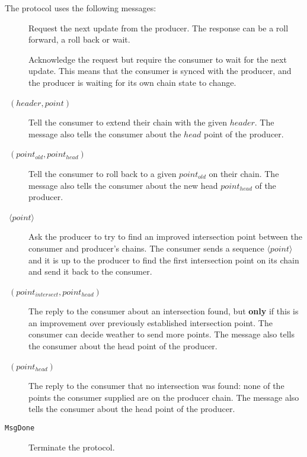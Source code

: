 \documentclass{report}
\newcommand{\msg}[1]{\texttt{#1}}
\newcommand{\MsgDone}{\msg{MsgDone}}
\theoremstyle{definition}{
  \newtheorem{lemma}{Lemma}[section] %
  \newtheorem{definition}[lemma]{Definition}
}
\theoremstyle{theorem}{
  \newtheorem{invariant}[lemma]{Invariant}
  \newtheorem{proofobligation}[lemma]{Proof Obligation}
}
\numberwithin{equation}{lemma}
\begin{document}
The protocol uses the following messages:
\begin{description}
\item [\RequestNext]
      Request the next update from the producer.
      The response can be a roll forward, a roll back or wait.
\item [\AwaitReply]
      Acknowledge the request but require the consumer to wait for the next update.
      This means that the consumer is synced with the producer, and
      the producer is waiting for its own chain state to change.
\item [\RollForward~{\boldmath $(header,point)$}]
      Tell the consumer to extend their chain with the given $header$.
      The message also tells the consumer about the $head$ point of the producer.
\item [\RollBackward~{\boldmath $(point_{old},point_{head})$}]
      Tell the consumer to roll back to a given $point_{old}$ on their chain.
      The message also tells the consumer about the new head $point_{head}$ of the producer.
\item [\FindIntersect~{\boldmath $\langle point \rangle $}]
      Ask the producer to try to find an improved intersection point between
      the consumer and producer's chains.
      The consumer sends a sequence {\boldmath $\langle point \rangle $}
      and it is up to the producer
      to find the first intersection point on its chain and send it back to the consumer.
\item [\IntersectImproved~{\boldmath $(point_{intersect},point_{head})$}]
      The reply to the consumer about an intersection found, but {\bf only} if this
      is an improvement over previously established intersection point.
      The consumer can decide weather to send more points.
      The message also tells the consumer about the head point of the producer.
\item [\IntersectUnchanged~{\boldmath $(point_{head})$}]
      The reply to the consumer that no intersection was found: none of the
      points the consumer supplied are on the producer chain.
      The message also tells the consumer about the head point of the producer.
\item [\MsgDone]
      Terminate the protocol.
\end{description}
\end{document}
